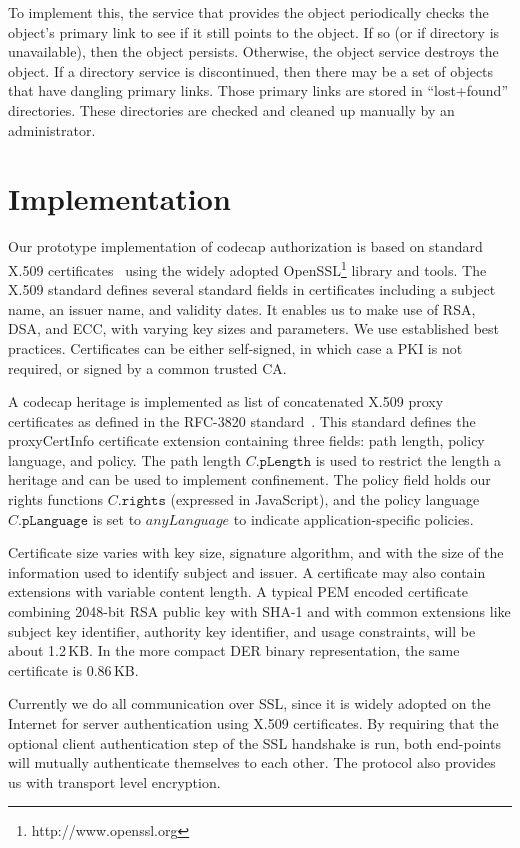 \documentclass[10pt, conference, compsocconf]{IEEEtran}
\begin{document}
To implement this, the service that provides the object periodically
checks the object's primary link to see if it still points to the object.
If so (or if directory is unavailable), then the object persists.
Otherwise, the object service destroys the object.
If a directory service is discontinued, then there may be a set of
objects that have dangling primary links.  Those primary links are
stored in ``lost+found'' directories.
These directories are
checked and cleaned up manually by an administrator.

\section{Implementation}

Our prototype implementation of codecap authorization is based on
standard X.509 certificates~\cite{RFC-5280} using the widely adopted
OpenSSL\footnote{http://www.openssl.org}
library and tools.  The X.509 standard defines
several standard fields in certificates including a subject
name, an issuer name, and validity dates.  It enables us to
make use of RSA, DSA, and ECC, with varying key sizes and parameters.
We use established best practices.  Certificates can be either
self-signed, in which case a PKI is not required, or signed by a
common trusted CA.

A codecap heritage is implemented as list of concatenated X.509
proxy certificates as defined in the RFC-3820 standard~\cite{RFC-3820}.
This standard defines the proxyCertInfo
certificate extension containing three fields: path length, policy
language, and policy.  The path length $C.\texttt{pLength}$ is used to
restrict the length a heritage and can be used to implement confinement.
The policy field holds our rights functions $C.\texttt{rights}$ (expressed in
JavaScript), and the policy
language $C.\texttt{pLanguage}$ is set to $anyLanguage$ to indicate
application-specific policies.


Certificate size varies with key size, signature algorithm, and with
the size of the information used to identify subject and issuer.
A certificate may also contain extensions with variable content
length.  A typical PEM encoded certificate combining 2048-bit RSA
public key with SHA-1 and with common extensions like subject key
identifier, authority key identifier, and usage constraints, will
be about 1.2\,KB.  In the more compact DER binary representation,
the same certificate is 0.86\,KB.

Currently we do all communication over SSL, since it is
widely adopted on the Internet for server authentication using X.509
certificates.  By requiring that the optional client authentication
step of the SSL handshake is run, both end-points will mutually
authenticate themselves to each other. The protocol also provides
us with transport level encryption.
\end{document}

